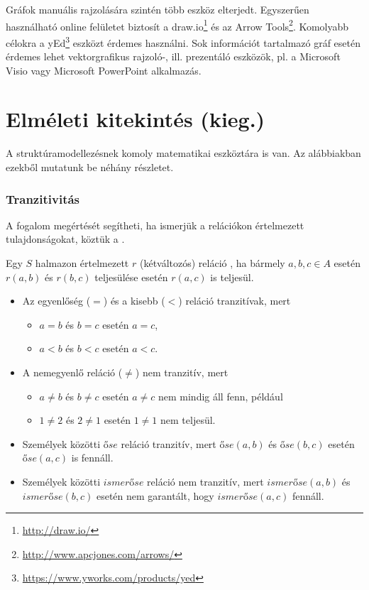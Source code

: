 Gráfok manuális rajzolására szintén több eszköz elterjedt. Egyszerűen használható online felületet biztosít a draw.io\footnote{\url{http://draw.io/}} és az Arrow Tools\footnote{\url{http://www.apcjones.com/arrows/}}. Komolyabb célokra a yEd\footnote{\url{https://www.yworks.com/products/yed}} eszközt érdemes használni. Sok információt tartalmazó gráf esetén érdemes lehet vektorgrafikus rajzoló-, ill. prezentáló eszközök, pl. a Microsoft Visio vagy Microsoft PowerPoint alkalmazás.


\section{Elméleti kitekintés (kieg.)}

A struktúramodellezésnek komoly matematikai eszköztára is van. Az alábbiakban ezekből mutatunk be néhány részletet.

\subsubsection{Tranzitivitás}

A  fogalom megértését segítheti, ha ismerjük a relációkon értelmezett tulajdonságokat, köztük a .

Egy $S$ halmazon értelmezett $r$ (kétváltozós) reláció , ha bármely $a,b,c \in A$ esetén $r(a, b)$ és $r(b, c)$ teljesülése esetén $r(a, c)$ is teljesül.

\begin{itemize}
	\item Az egyenlőség ($=$) és a kisebb ($<$) reláció tranzitívak, mert
	\begin{itemize}
		\item $a = b$ és $b = c$ esetén $a = c$,
		\item $a < b$ és $b < c$ esetén $a < c$.
	\end{itemize}
	\item A nemegyenlő reláció ($\neq$) nem tranzitív, mert 
	\begin{itemize}
		\item $a \neq b$ és $b \neq c$ esetén $a \neq c$ nem mindig áll fenn, például
		\item $1 \neq 2$ és $2 \neq 1$ esetén $1 \neq 1$ nem teljesül.
	\end{itemize}
	\item Személyek közötti $\mathit{őse}$ reláció tranzitív, mert $\mathit{őse}(a, b)$ és $\mathit{őse}(b, c)$ esetén $\mathit{őse}(a, c)$ is fennáll. 
	\item Személyek közötti $\mathit{ismerőse}$ reláció nem tranzitív, mert $\mathit{ismerőse}(a, b)$ és $\mathit{ismerőse}(b, c)$ esetén nem garantált, hogy $\mathit{ismerőse}(a, c)$ fennáll.
\end{itemize}

